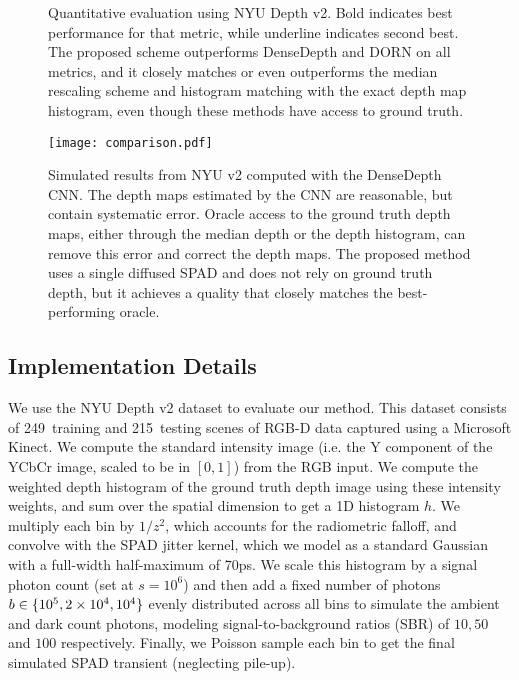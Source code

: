 \begin{figure*}[!t]
\begin{center}

\caption{Quantitative evaluation using NYU Depth v2. Bold indicates best performance for that metric, while underline indicates second best. The proposed scheme outperforms DenseDepth and DORN on all metrics, and it closely matches or even outperforms the median rescaling scheme and histogram matching with the exact depth map histogram, even though these methods have access to ground truth. }
\end{center}
\end{figure*}

\begin{figure*}[!t]
  \texttt{[image: comparison.pdf]}
  \caption{Simulated results from NYU v2 computed with the DenseDepth CNN. The depth maps estimated by the CNN are reasonable, but contain systematic error. Oracle access to the ground truth depth maps, either through the median depth or the depth histogram, can remove this error and correct the depth maps. The proposed method uses a single diffused SPAD and does not rely on ground truth depth, but it achieves a quality that closely matches the best-performing oracle.}
	\label{fig:results_simulated}
\end{figure*}


\subsection{Implementation Details}

We use the NYU Depth v2 dataset to evaluate our method. This dataset consists of
249~training and 215~testing scenes of RGB-D data captured using a Microsoft
Kinect.
We compute the standard intensity image (i.e. the Y
component of the YCbCr image, scaled to be in $[0,1]$) from the RGB input. We compute the weighted depth
histogram of the ground truth depth image using these intensity weights, and sum
over the spatial dimension to get a 1D histogram $h$. We multiply each bin by
$1/z^2$, which accounts for the radiometric falloff, and convolve with the SPAD
jitter kernel, which we model as a standard Gaussian with a full-width
half-maximum of 70ps. We scale this histogram by a signal photon count (set at
$s = 10^6$) and then add a fixed number of photons $b \in \{10^5, 2\times 10^4, 10^4\}$ evenly distributed across all
bins to simulate the ambient and dark count photons, modeling
signal-to-background ratios (SBR) of $10, 50$ and $100$ respectively. Finally,
we Poisson sample each bin to get the final simulated SPAD transient (neglecting
pile-up).

